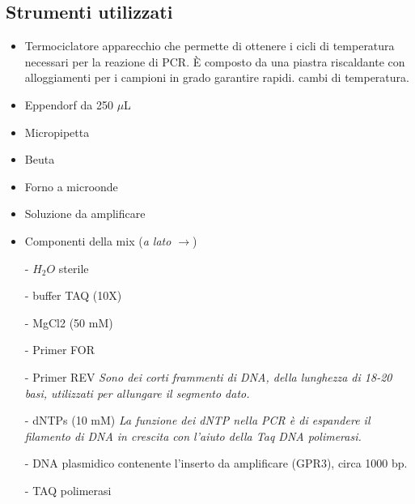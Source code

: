 \documentclass{extarticle}
\begin{document}
\subsection*{Strumenti utilizzati}
\begin{minipage}{0.5\textwidth}
    \begin{itemize}
        \item Termociclatore
        \subitem apparecchio che permette di ottenere i cicli di temperatura necessari per la reazione di PCR. È composto da una piastra riscaldante con alloggiamenti per i campioni in grado garantire rapidi.
        cambi di temperatura.
        \item Eppendorf da 250 $\mu$L
        \item Micropipetta
        \item Beuta
        \item Forno a microonde
        \item Soluzione da amplificare
        \item Componenti della mix (\textit{a lato $\rightarrow$})
    \end{itemize}
\end{minipage} \hfill
\begin{minipage}{0.50\textwidth}
    \small
    \begin{itemize}
        \item[-] $H_{2}O$ sterile
        \item[-] buffer TAQ (10X)
        \item[-] MgCl2 (50 mM)
        \item[-] Primer FOR
        \item[-] Primer REV
        \subitem \textit{Sono dei corti frammenti di DNA, della lunghezza di 18-20 basi, utilizzati per allungare il segmento dato.}
        \item[-] dNTPs (10 mM)
        \subitem \textit{La funzione dei dNTP nella PCR è di espandere il filamento di DNA in crescita con l'aiuto della Taq DNA polimerasi.}
        \item[-] DNA plasmidico contenente l'inserto da amplificare (GPR3), circa 1000 bp.
        \item[-] TAQ polimerasi
    \end{itemize}
\end{minipage}
\end{document}
